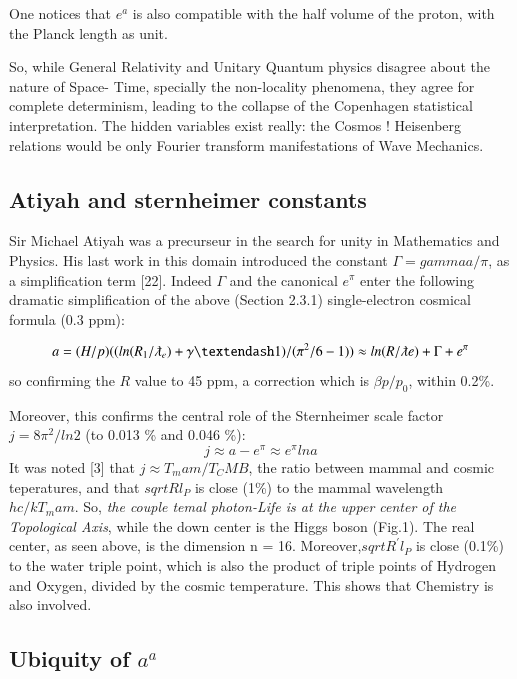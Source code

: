 \documentclass[twoside,draft]{article}
\begin{document}
\begin{sloppypar}
{One notices that $e^{a}$ is also compatible with the half volume of the proton, with
the Planck length as unit.

So, while General Relativity and Unitary Quantum physics disagree about the nature of Space-
Time, specially the non-locality phenomena, they agree for complete determinism, leading to the collapse of the
Copenhagen statistical interpretation. The hidden variables exist really: the Cosmos ! Heisenberg
relations would be only Fourier transform manifestations of Wave Mechanics.


\subsection{Atiyah and sternheimer constants}
    Sir Michael Atiyah was a precurseur in the search for unity in Mathematics and Physics. His last work in this domain introduced the constant $\Gamma = gamma a /\pi$, as a simplification term [22]. Indeed $\Gamma$ and the canonical $e^{\pi}$ enter the following dramatic simplification of the above (Section 2.3.1) single-electron cosmical formula (0.3 ppm):
    
\begin{equation}
a = (H/p)((ln(R_1/\lambdabar_e) + \gamma – 1)/(\pi^2/6 - 1)) \approx ln(R/\lambdabar e) + \Gamma + e^{\pi}
\end{equation}
so confirming the $R$ value to 45 ppm, a correction which is $\beta p/p_0$, within 0.2\%.

Moreover, this confirms the central role of the Sternheimer scale factor $j = 8\pi^2/ln2$ (to 0.013 \% and 0.046 \%):
\begin{equation}
j \approx a - e^{\pi} \approx e^{\pi} lna
\end{equation}
It was noted [3] that $j\approx T_mam/T_CMB$, the ratio between mammal and cosmic teperatures, and that $sqrt{Rl_P}$ is close (1\%) to the mammal wavelength $hc/kT_mam$. So, \textit{the couple temal photon-Life is at the upper center of the Topological Axis}, while the down center is  the Higgs boson (Fig.1). The real center, as seen above, is the dimension n = 16. Moreover,$sqrt{R^{\prime}l_P}$ is close (0.1\%) to the water triple point, which is also the product of triple points of Hydrogen and Oxygen, divided by the cosmic temperature. This shows that Chemistry is also involved.


\subsection{Ubiquity of $a^{a}$}

}
\end{sloppypar}
\end{document}
